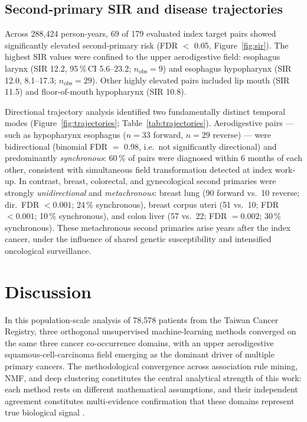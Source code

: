 \documentclass[review,12pt]{elsarticle}
\begin{document}
\subsection{Second-primary SIR and disease trajectories}
Across 288,424 person-years, 69 of 179 evaluated index\,\textrightarrow\,target
pairs showed significantly elevated second-primary risk (FDR $<$ 0.05,
Figure~\ref{fig:sir}). The highest SIR values were confined to the
upper aerodigestive field: esophagus\,\textrightarrow\,larynx (SIR 12.2, 95\,\%\,CI
5.6--23.2; $n_\text{obs} = 9$) and
esophagus\,\textrightarrow\,hypopharynx (SIR 12.0, 8.1--17.3;
$n_\text{obs} = 29$). Other highly elevated pairs included
lip\,\textrightarrow\,mouth (SIR 11.5) and
floor-of-mouth\,\textrightarrow\,hypopharynx (SIR 10.8).

Directional trajectory analysis identified two fundamentally distinct temporal
modes (Figure~\ref{fig:trajectories}; Table~\ref{tab:trajectories}).
Aerodigestive pairs --- such as hypopharynx\,\textrightarrow\,esophagus
($n = 33$ forward, $n = 29$ reverse) --- were bidirectional (binomial FDR $=$ 0.98,
i.e.\ not significantly directional) and predominantly \textit{synchronous}:
60\,\% of pairs were diagnosed within 6 months of each other, consistent
with simultaneous field transformation detected at index work-up. In contrast,
breast, colorectal, and gynecological second primaries were strongly
\textit{unidirectional} and \textit{metachronous}: breast\,\textrightarrow\,lung
(90 forward vs.\ 10 reverse; dir.\ FDR $< 0.001$; 24\,\% synchronous),
breast\,\textrightarrow\,corpus uteri (51 vs.\ 10; FDR $< 0.001$; 10\,\%
synchronous), and colon\,\textrightarrow\,liver (57 vs.\ 22; FDR $= 0.002$;
30\,\% synchronous). These metachronous second primaries arise years after the
index cancer, under the influence of shared genetic susceptibility and
intensified oncological surveillance.

\section{Discussion}

In this population-scale analysis of 78,578 patients from the Taiwan Cancer
Registry, three orthogonal unsupervised machine-learning methods converged on
the same three cancer co-occurrence domains, with an upper aerodigestive
squamous-cell-carcinoma field emerging as the dominant driver of multiple
primary cancers. The methodological convergence across association rule mining,
NMF, and deep clustering constitutes the central analytical strength of this
work: each method rests on different mathematical assumptions, and their
independent agreement constitutes multi-evidence confirmation that these domains
represent true biological signal \cite{Vogt2017}.
\end{document}
